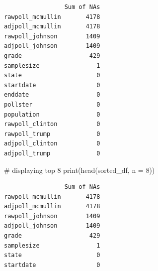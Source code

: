 \documentclass[
  letterpaper,
  DIV=11,
  numbers=noendperiod]{scrartcl}
\newenvironment{Shaded}{\begin{snugshade}}{\end{snugshade}}
\newcommand{\AttributeTok}[1]{\textcolor[rgb]{0.40,0.45,0.13}{#1}}
\newcommand{\CommentTok}[1]{\textcolor[rgb]{0.37,0.37,0.37}{#1}}
\newcommand{\DecValTok}[1]{\textcolor[rgb]{0.68,0.00,0.00}{#1}}
\newcommand{\FunctionTok}[1]{\textcolor[rgb]{0.28,0.35,0.67}{#1}}
\newcommand{\NormalTok}[1]{\textcolor[rgb]{0.00,0.23,0.31}{#1}}
\begin{document}
\begin{verbatim}
                 Sum of NAs
rawpoll_mcmullin       4178
adjpoll_mcmullin       4178
rawpoll_johnson        1409
adjpoll_johnson        1409
grade                   429
samplesize                1
state                     0
startdate                 0
enddate                   0
pollster                  0
population                0
rawpoll_clinton           0
rawpoll_trump             0
adjpoll_clinton           0
adjpoll_trump             0
\end{verbatim}

\begin{Shaded}
\begin{Highlighting}[]
\CommentTok{\# displaying top 8}
\FunctionTok{print}\NormalTok{(}\FunctionTok{head}\NormalTok{(sorted\_df, }\AttributeTok{n =} \DecValTok{8}\NormalTok{))}
\end{Highlighting}
\end{Shaded}

\begin{verbatim}
                 Sum of NAs
rawpoll_mcmullin       4178
adjpoll_mcmullin       4178
rawpoll_johnson        1409
adjpoll_johnson        1409
grade                   429
samplesize                1
state                     0
startdate                 0
\end{verbatim}
\end{document}
